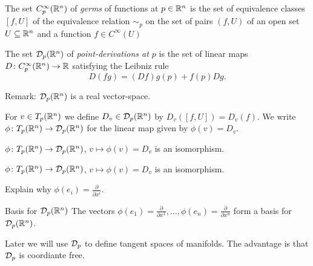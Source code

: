 \begin{frame}
  \begin{definition}[Germs]
    The set $C^{\infty}_p(\mathbb R^n)$ of {\em germs} of functions at $p \in \mathbb R^n$ is
    the set of equivalence classes $[f, U]$ of the equivalence relation $\sim_p$ on
    the set of pairs $(f, U)$ of an open set $U \subseteq \mathbb R^n$ and a function
    $f \in C^{\infty}(U)$
  \end{definition}
  \begin{definition}
    The set ${\mathcal D}_p(\mathbb R^n)$ of {\em point-derivations at $p$} is the set of 
    linear maps $D \colon C^{\infty}_p(\mathbb R^n) \to \mathbb R$ satisfying the Leibniz rule
    \begin{displaymath}
      D(fg) = (Df)g(p) + f(p)Dg.
    \end{displaymath}
  \end{definition}
  Remark: ${\mathcal D}_p(\mathbb R^n)$ is a real vector-space.
  \begin{definition}
    For $v \in T_p(\mathbb R^n)$ we define $D_v \in {\mathcal D}_p(\mathbb R^n)$ by
    $D_v([f, U]) = D_v(f)$.
    We write $\phi \colon T_p(\mathbb R^n) \to {\mathcal D}_p(\mathbb R^n)$ for the linear map
    given by $\phi(v) = D_v$.
  \end{definition}
  \begin{thm}
    $\phi \colon T_p(\mathbb R^n) \to {\mathcal D}_p(\mathbb R^n)$, $v \mapsto \phi(v) = D_v$ is an isomorphism.
  \end{thm}
\end{frame}

\begin{frame}
  \begin{thm}
    $\phi \colon T_p(\mathbb R^n) \to {\mathcal D}_p(\mathbb R^n)$, $v \mapsto \phi(v) = D_v$ is an isomorphism.
  \end{thm}
  \begin{exercise}
    Explain why $\phi(e_i) = \frac{\partial}{\partial x^i}$.
  \end{exercise}
  \begin{block}
    {Basis for ${\mathcal D}_p(\mathbb R^n)$}
    The vectors 
    $\phi(e_1) = \frac{\partial}{\partial x^1}, \dots,
    \phi(e_n) = \frac{\partial}{\partial x^n}$ form a basis 
    for ${\mathcal D}_p(\mathbb R^n)$.
  \end{block}
  \begin{remark}
    Later we will use ${\mathcal D}_p$ to define tangent spaces of manifolds.
    The advantage is that ${\mathcal D}_p$ is coordiante free.
  \end{remark}
\end{frame}

